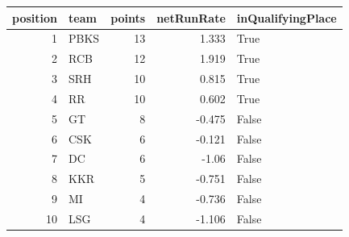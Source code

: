 {\small
\begin{tabular}{rlrrl}
\toprule
\textbf{position} & \textbf{team} & \textbf{points} & \textbf{netRunRate} & \textbf{inQualifyingPlace} \\
\midrule
1 & PBKS & 13 & 1.333 & True \\
2 & RCB & 12 & 1.919 & True \\
3 & SRH & 10 & 0.815 & True \\
4 & RR & 10 & 0.602 & True \\
5 & GT & 8 & -0.475 & False \\
6 & CSK & 6 & -0.121 & False \\
7 & DC & 6 & -1.06 & False \\
8 & KKR & 5 & -0.751 & False \\
9 & MI & 4 & -0.736 & False \\
10 & LSG & 4 & -1.106 & False \\
\bottomrule
\end{tabular}}
